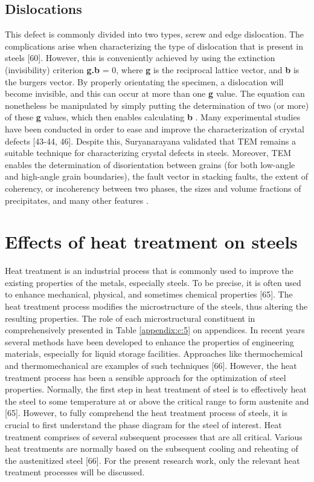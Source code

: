\documentclass[12pt]{report}
\begin{document}
\subsection{Dislocations}   
This defect is commonly divided into two types, screw and edge dislocation. The complications arise when characterizing the type of dislocation that is present in steels [60]. However, this is conveniently achieved by using the extinction (invisibility) criterion \textbf{g.b} = 0, where \textbf{g} is the reciprocal lattice vector, and \textbf{b} is the burgers vector. By properly orientating the specimen, a dislocation will become invisible, and this can occur at more than one \textbf{g} value. The equation can nonetheless be manipulated by simply putting the determination of two (or more) of these \textbf{g} values, which then enables calculating \textbf{b} \cite{suryanarayana2017microstructure}. 
Many experimental studies have been conducted in order to ease and improve the characterization of crystal defects [43-44, 46]. Despite this, Suryanarayana \cite{suryanarayana2017microstructure} validated that TEM remains a suitable technique for characterizing crystal defects in steels. Moreover, TEM enables the determination of disorientation between grains (for both low-angle and high-angle grain boundaries), the fault vector in stacking faults, the extent of coherency, or incoherency between two phases, the sizes and volume fractions of precipitates, and many other features \cite{suryanarayana2017microstructure}.

\section{Effects of heat treatment on steels} 
Heat treatment is an industrial process that is commonly used to improve the existing properties of the metals, especially steels. To be precise, it is often used to enhance mechanical, physical, and sometimes chemical properties [65]. The heat treatment process modifies the microstructure of the steels, thus altering the resulting properties. The role of each microstructural constituent in comprehensively presented in Table \ref{appendix:c:5} on appendices. In recent years several methods have been developed to enhance the properties of engineering materials, especially for liquid storage facilities. Approaches like thermochemical and thermomechanical are examples of such techniques [66]. However, the heat treatment process has been a sensible approach for the optimization of steel properties.
Normally, the first step in heat treatment of steel is to effectively heat the steel to some temperature at or above the critical range to form austenite and  [65]. However, to fully comprehend the heat treatment process of steels, it is crucial to first understand the phase diagram for the steel of interest. Heat treatment comprises of several subsequent processes that are all critical. Various heat treatments are normally based on the subsequent cooling and reheating of the austenitized steel [66].  For the present research work, only the relevant heat treatment processes will be discussed.
\end{document}
